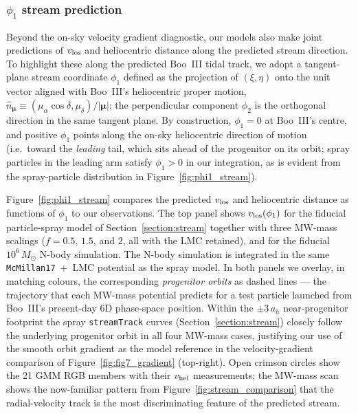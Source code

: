 \documentclass[twocolumn, apj, numberedappendix, appendixfloats]{openjournal_dhayaa}
\begin{document}
\subsubsection{$\phi_1$ stream prediction}
Beyond the on-sky velocity gradient diagnostic, our models also make joint predictions of $v_{\rm los}$ and heliocentric distance along the predicted stream direction. To highlight these along the predicted Boo~III tidal track, we adopt a tangent-plane stream coordinate $\phi_1$ defined as the projection of $(\xi, \eta)$ onto the unit vector aligned with Boo~III's heliocentric proper motion, $\hat{n}_{\boldsymbol\mu} \equiv (\mu_\alpha\cos\delta, \mu_\delta) / |\boldsymbol\mu|$; the perpendicular component $\phi_2$ is the orthogonal direction in the same tangent plane. By construction, $\phi_1 = 0$ at Boo~III's centre, and positive $\phi_1$ points along the on-sky heliocentric direction of motion (i.e.\ toward the \emph{leading} tail, which sits ahead of the progenitor on its orbit; spray particles in the leading arm satisfy $\phi_1 > 0$ in our integration, as is evident from the spray-particle distribution in Figure~\ref{fig:phi1_stream}).

Figure~\ref{fig:phi1_stream} compares the predicted $v_{\rm los}$ and heliocentric distance as functions of $\phi_1$ to our observations. The top panel shows $v_{\rm los}(\phi_1)$ for the fiducial particle-spray model of Section~\ref{section:stream} \citep[\texttt{galpy}'s \texttt{fardal15spraydf} implementation of the][Lagrange-point spray algorithm]{Fardal2015} together with three MW-mass scalings ($f=0.5$, $1.5$, and $2$, all with the LMC retained), and for the fiducial $10^6\,M_\odot$ N-body simulation. The N-body simulation is integrated in the same \texttt{McMillan17}~+~LMC potential as the spray model. In both panels we overlay, in matching colours, the corresponding \emph{progenitor orbits} as dashed lines --- the trajectory that each MW-mass potential predicts for a test particle launched from Boo~III's present-day 6D phase-space position. Within the $\pm 3\,a_h$ near-progenitor footprint the spray \texttt{streamTrack} curves (Section~\ref{section:stream}) closely follow the underlying progenitor orbit in all four MW-mass cases, justifying our use of the smooth orbit gradient as the model reference in the velocity-gradient comparison of Figure~\ref{fig:fig7_gradient} (top-right). Open crimson circles show the 21 GMM RGB members with their $v_{\rm hel}$ measurements; the MW-mass scan shows the now-familiar pattern from Figure~\ref{fig:stream_comparison} that the radial-velocity track is the most discriminating feature of the predicted stream.
\end{document}
